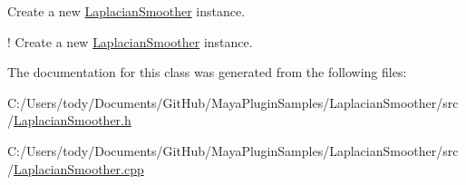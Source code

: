 Create a new \hyperlink{class_laplacian_smoother}{Laplacian\+Smoother} instance. 

! Create a new \hyperlink{class_laplacian_smoother}{Laplacian\+Smoother} instance. 

The documentation for this class was generated from the following files\+:\begin{DoxyCompactItemize}
\item 
C\+:/\+Users/tody/\+Documents/\+Git\+Hub/\+Maya\+Plugin\+Samples/\+Laplacian\+Smoother/src/\hyperlink{_laplacian_smoother_8h}{Laplacian\+Smoother.\+h}\item 
C\+:/\+Users/tody/\+Documents/\+Git\+Hub/\+Maya\+Plugin\+Samples/\+Laplacian\+Smoother/src/\hyperlink{_laplacian_smoother_8cpp}{Laplacian\+Smoother.\+cpp}\end{DoxyCompactItemize}
